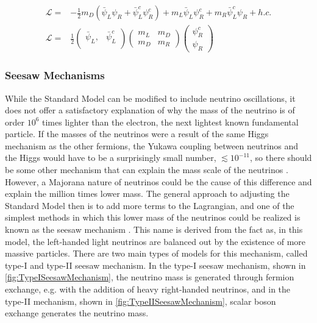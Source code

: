 \begin{align}
\mathcal{L} = & -\frac{1}{2}m_D(\bar{\psi}_L\psi_R+\bar{\psi}^c_L\psi^c_R)+m_L\bar{\psi}_L\psi^c_R+m_R\bar{\psi}^c_L\psi_R +h.c. \\
\mathcal{L} = &\frac{1}{2} \begin{pmatrix}
\bar{\psi}_L,& \bar{\psi}^c_L \\
\end{pmatrix} \begin{pmatrix}
m_L & m_D \\
m_D & m_R
\end{pmatrix}
\begin{pmatrix}
\psi^c_R \\
\psi_R
\end{pmatrix}
\end{align}

\subsubsection*{Seesaw Mechanisms}
While the Standard Model can be modified to include neutrino oscillations, it does not offer a satisfactory explanation of why the mass of the neutrino is of order $10^6$ times lighter than the electron, the next lightest known fundamental particle. If the masses of the neutrinos were a result of the same Higgs mechanism as the other fermions, the Yukawa coupling between neutrinos and the Higgs would have to be a surprisingly small number, $\lesssim 10^{-11}$, so there should be some other mechanism that can explain the mass scale of the neutrinos \cite{Merle:2013gea}. However, a Majorana nature of neutrinos could be the cause of this difference and explain the million times lower mass. The general approach to adjusting the Standard Model then is to add more terms to the Lagrangian, and one of the simplest methods in which this lower mass of the neutrinos could be realized is known as the seesaw mechanism \cite{PhysRevD.22.2227}. This name is derived from the fact as, in this model, the left-handed light neutrinos are balanced out by the existence of more massive particles. There are two main types of models for this mechanism, called type-I and type-II seesaw mechanism. In the type-I seesaw mechanism, shown in \autoref{fig:TypeISeesawMechanism}, the neutrino mass is generated through fermion exchange, e.g. with the addition of heavy right-handed neutrinos, 
and in the type-II mechanism, shown in \autoref{fig:TypeIISeesawMechanism}, scalar boson exchange generates the neutrino mass.

